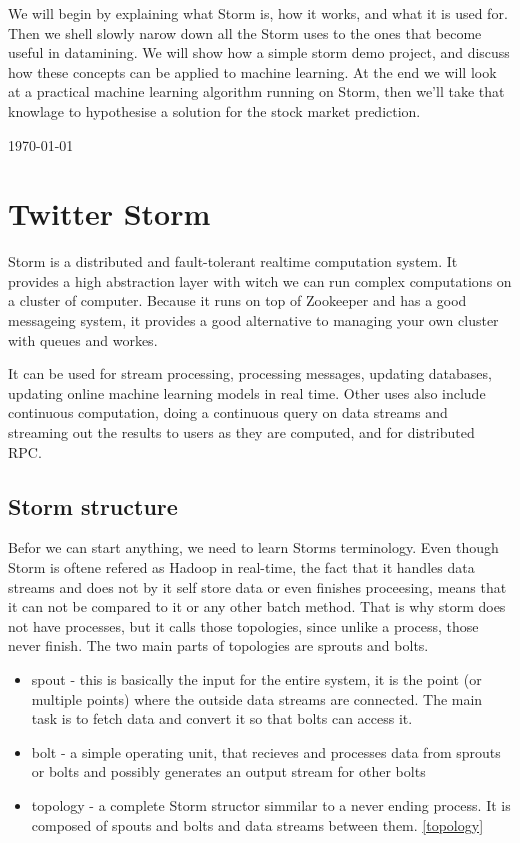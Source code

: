 \documentclass[journal]{IEEEtran/IEEEtran}
\begin{document}
We will begin by explaining what Storm is, how it works, and what it is used for. Then we shell slowly narow down all the Storm uses to the ones that become useful in datamining. We will show how a simple storm demo project, and discuss how these concepts can be applied to machine learning. At the end we will look at a practical machine learning algorithm running on Storm, then we'll take that knowlage to hypothesise a solution for the stock market prediction.

\hfill \today
\section{Twitter Storm}
Storm is a distributed and fault-tolerant realtime computation system. It provides a high abstraction layer with witch we can run complex computations on a cluster of computer. Because it runs on top of Zookeeper and has a good messageing system, it provides a good alternative to managing your own cluster with queues and workes. 

It can be used for stream processing, processing messages, updating databases, updating online machine learning models in real time. Other uses also include continuous computation, doing a continuous query on data streams and streaming out the results to users as they are computed, and for distributed RPC.


\subsection{Storm structure}
Befor we can start anything, we need to learn Storms terminology. Even though Storm is oftene refered as Hadoop in real-time, the fact that it handles data streams and does not by it self store data or even finishes proceesing, means that it can not be compared to it or any other batch method. That is why storm does not have processes, but it calls those topologies, since unlike a process, those never finish. The two main parts of topologies are sprouts and bolts. 

\begin{itemize}
    \item spout - this is basically the input for the entire system, it is the point (or multiple points) where the outside data streams are connected. The main task is to fetch data and convert it so that bolts can access it.
    \item bolt - a simple operating unit, that recieves and processes data from sprouts or bolts and possibly generates an output stream for other bolts
    \item topology - a complete Storm structor simmilar to a never ending process. It is composed of spouts and bolts and data streams between them. \ref{topology}
\end{itemize}
\end{document}
